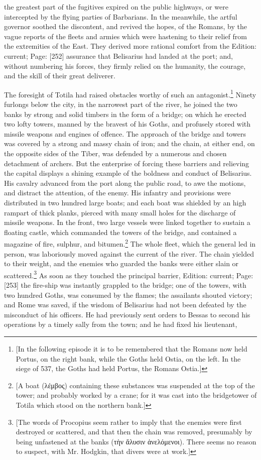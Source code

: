 the greatest part of the fugitives expired on the public highways, or were intercepted by the flying parties of Barbarians. In the meanwhile, the artful governor soothed the discontent, and revived the hopes, of the Romans, by the vague reports of the fleets and armies which were hastening to their relief from the extremities of the East. They derived more rational comfort from the Edition: current; Page: [252] assurance that Belisarius had landed at the port; and, without numbering his forces, they firmly relied on the humanity, the courage, and the skill of their great deliverer.

The foresight of Totila had raised obstacles worthy of such an antagonist.\footnote{[In the following episode it is to be remembered that the Romans now held Portus, on the right bank, while the Goths held Ostia, on the left. In the siege of 537, the Goths had held Portus, the Romans Ostia.]} Ninety furlongs below the city, in the narrowest part of the river, he joined the two banks by strong and solid timbers in the form of a bridge; on which he erected two lofty towers, manned by the bravest of his Goths, and profusely stored with missile weapons and engines of offence. The approach of the bridge and towers was covered by a strong and massy chain of iron; and the chain, at either end, on the opposite sides of the Tiber, was defended by a numerous and chosen detachment of archers. But the enterprise of forcing these barriers and relieving the capital displays a shining example of the boldness and conduct of Belisarius. His cavalry advanced from the port along the public road, to awe the motions, and distract the attention, of the enemy. His infantry and provisions were distributed in two hundred large boats; and each boat was shielded by an high rampart of thick planks, pierced with many small holes for the discharge of missile weapons. In the front, two large vessels were linked together to sustain a floating castle, which commanded the towers of the bridge, and contained a magazine of fire, sulphur, and bitumen.\footnote{[A boat (\textgreek{λέμβος}) containing these substances was suspended at the top of the tower; and probably worked by a crane; for it was cast into the bridgetower of Totila which stood on the northern bank.]} The whole fleet, which the general led in person, was laboriously moved against the current of the river. The chain yielded to their weight, and the enemies who guarded the banks were either slain or scattered.\footnote{[The words of Procopius seem rather to imply that the enemies were first destroyed or scattered, and that then the chain was removed, presumably by being unfastened at the banks (\textgreek{τ\texthebrew{ὴ}ν \texthebrew{ἄ}λυσιν \texthebrew{ἀ}νελόμενοι}). There seems no reason to suspect, with Mr. Hodgkin, that divers were at work.]} As soon as they touched the principal barrier, Edition: current; Page: [253] the fire-ship was instantly grappled to the bridge; one of the towers, with two hundred Goths, was consumed by the flames; the assailants shouted victory; and Rome was saved, if the wisdom of Belisarius had not been defeated by the misconduct of his officers. He had previously sent orders to Bessas to second his operations by a timely sally from the town; and he had fixed his lieutenant, 
